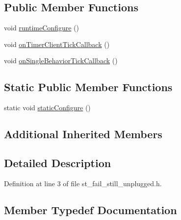 \subsection*{Public Member Functions}
\begin{DoxyCompactItemize}
\item 
void \hyperlink{structsm__pr2__plugs_1_1StFailStillUnplugged_af8704d60b24ec65be825b5dc416632d1}{runtime\+Configure} ()
\item 
void \hyperlink{structsm__pr2__plugs_1_1StFailStillUnplugged_a9778180fa18c15f2d94c774ebde4c7cf}{on\+Timer\+Client\+Tick\+Callback} ()
\item 
void \hyperlink{structsm__pr2__plugs_1_1StFailStillUnplugged_ac9dc49f0681e4d6a17b30461881b9572}{on\+Single\+Behavior\+Tick\+Callback} ()
\end{DoxyCompactItemize}
\subsection*{Static Public Member Functions}
\begin{DoxyCompactItemize}
\item 
static void \hyperlink{structsm__pr2__plugs_1_1StFailStillUnplugged_a42820633846d0c87f9793a11b484d292}{static\+Configure} ()
\end{DoxyCompactItemize}
\subsection*{Additional Inherited Members}


\subsection{Detailed Description}


Definition at line 3 of file st\+\_\+fail\+\_\+still\+\_\+unplugged.\+h.



\subsection{Member Typedef Documentation}
\mbox{\label{structsm__pr2__plugs_1_1StFailStillUnplugged_a58dc75afc3040293cac801248a1c999c}} 
